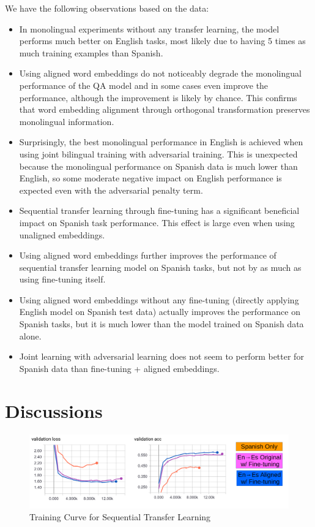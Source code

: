 \documentclass[]{article}
\begin{document}
We have the following observations based on the data:
\begin{itemize}
	\item In monolingual experiments without any transfer learning, the model performs much better on English tasks, most likely due to having 5 times as much training examples than Spanish.
	\item Using aligned word embeddings do not noticeably degrade the monolingual performance of the QA model and in some cases even improve the performance, although the improvement is likely by chance. This confirms that word embedding alignment through orthogonal transformation preserves monolingual information.
	\item Surprisingly, the best monolingual performance in English is achieved when using joint bilingual training with adversarial training. This is unexpected because the monolingual performance on Spanish data is much lower than English, so some moderate negative impact on English performance is expected even with the adversarial penalty term.
	\item Sequential transfer learning through fine-tuning has a significant beneficial impact on Spanish task performance. This effect is large even when using unaligned embeddings.
	\item Using aligned word embeddings further improves the performance of sequential transfer learning model on Spanish tasks, but not by as much as using fine-tuning itself.
	\item Using aligned word embeddings without any fine-tuning (directly applying English model on Spanish test data) actually improves the performance on Spanish tasks, but it is much lower than the model trained on Spanish data alone.
	\item Joint learning with adversarial learning does not seem to perform better for Spanish data than fine-tuning + aligned embeddings.
\end{itemize} 


\section{Discussions}

\begin{center}
	\begin{figure}
		\includegraphics[width=\linewidth]{media/curve.png}
		\caption{Training Curve for Sequential Transfer Learning}
		\label{fig:curve}
	\end{figure}
\end{center}
\end{document}
